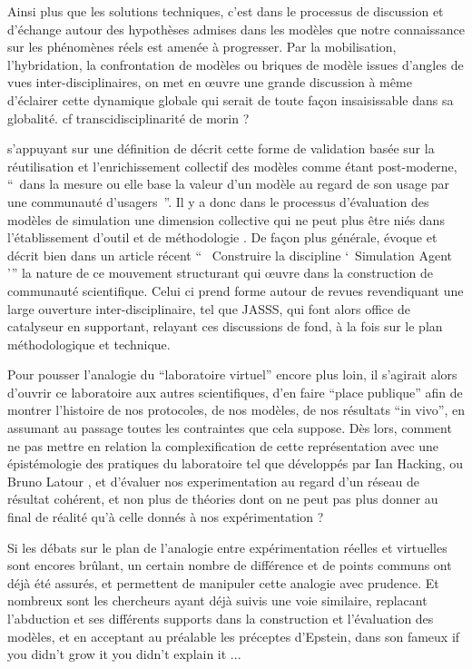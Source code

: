 {%

Ainsi plus que les solutions techniques, c'est dans le processus de discussion et d'échange autour des hypothèses admises dans les modèles que notre connaissance sur les phénomènes réels est amenée à progresser. Par la mobilisation, l'hybridation, la confrontation de modèles ou briques de modèle issues d'angles de vues inter-disciplinaires,  on met en œuvre une grande discussion à même d'éclairer cette dynamique globale qui serait de toute façon insaisissable dans sa globalité. {cf transcidisciplinarité de morin ?}
 
\autocite{Rouchier2013} s'appuyant sur une définition de  décrit cette forme de validation basée sur la réutilisation et l'enrichissement collectif des modèles comme étant post-moderne, \enquote{ dans la mesure ou elle base la valeur d'un modèle au regard de son usage par une communauté d'usagers }. Il y a donc dans le processus d'évaluation des modèles de simulation une dimension collective qui ne peut plus être niés dans l'établissement d'outil et de méthodologie . De façon plus générale, \autocite{Rouchier2013} évoque et décrit bien dans un article récent \enquote{  Construire la discipline \enquote{ Simulation Agent }} la nature de ce mouvement structurant qui œuvre dans la construction de communauté scientifique. Celui ci prend forme autour de revues revendiquant une large ouverture inter-disciplinaire, tel que JASSS, qui font alors office de catalyseur en supportant, relayant ces discussions de fond, à la fois sur le plan méthodologique et technique.

Pour pousser l'analogie du \enquote{laboratoire virtuel} encore plus loin, il s'agirait alors d'ouvrir ce laboratoire aux autres scientifiques, d'en faire \enquote{place publique} afin de montrer l'histoire de nos protocoles, de nos modèles, de nos résultats \foreignquote{latin}{in vivo}, en assumant au passage toutes les contraintes que cela suppose. Dès lors, comment ne pas mettre en relation la complexification de cette représentation avec une épistémologie des pratiques du laboratoire tel que développés par Ian Hacking, ou Bruno Latour , et d'évaluer nos experimentation au regard d'un réseau de résultat cohérent, et non plus de théories dont on ne peut pas plus donner au final de réalité qu'à celle donnés à nos expérimentation ? 

Si les débats sur le plan de l'analogie entre expérimentation réelles et virtuelles sont encores brûlant, un certain nombre de différence et de points communs ont déjà été assurés, et permettent de manipuler cette analogie avec prudence. Et nombreux sont les chercheurs ayant déjà suivis une voie similaire, replacant l'abduction et ses différents supports dans la construction et l'évaluation des modèles, et en acceptant au préalable les préceptes d'Epstein, dans son fameux if you didn't grow it you didn't explain it ... %

}
